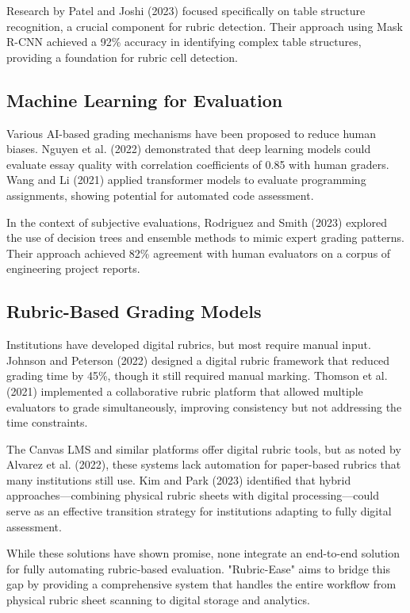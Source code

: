 \documentclass[12pt]{article}
\begin{document}
Research by Patel and Joshi (2023) focused specifically on table structure recognition, a crucial component for rubric detection. Their approach using Mask R-CNN achieved a 92\% accuracy in identifying complex table structures, providing a foundation for rubric cell detection.

\subsection{Machine Learning for Evaluation}
Various AI-based grading mechanisms have been proposed to reduce human biases. Nguyen et al. (2022) demonstrated that deep learning models could evaluate essay quality with correlation coefficients of 0.85 with human graders. Wang and Li (2021) applied transformer models to evaluate programming assignments, showing potential for automated code assessment.

In the context of subjective evaluations, Rodriguez and Smith (2023) explored the use of decision trees and ensemble methods to mimic expert grading patterns. Their approach achieved 82\% agreement with human evaluators on a corpus of engineering project reports.

\subsection{Rubric-Based Grading Models}
Institutions have developed digital rubrics, but most require manual input. Johnson and Peterson (2022) designed a digital rubric framework that reduced grading time by 45\%, though it still required manual marking. Thomson et al. (2021) implemented a collaborative rubric platform that allowed multiple evaluators to grade simultaneously, improving consistency but not addressing the time constraints.

The Canvas LMS and similar platforms offer digital rubric tools, but as noted by Alvarez et al. (2022), these systems lack automation for paper-based rubrics that many institutions still use. Kim and Park (2023) identified that hybrid approaches—combining physical rubric sheets with digital processing—could serve as an effective transition strategy for institutions adapting to fully digital assessment.

While these solutions have shown promise, none integrate an end-to-end solution for fully automating rubric-based evaluation. "Rubric-Ease" aims to bridge this gap by providing a comprehensive system that handles the entire workflow from physical rubric sheet scanning to digital storage and analytics.
\end{document}
